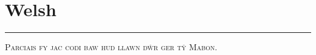 \vspace{-1em}\section*{\checkno Welsh}
\vspace{-.5em}\hrule\vspace{.5em}
\noindent\textsc{
Parciais fy jac codi baw hud llawn dŵr ger tŷ Mabon.
}